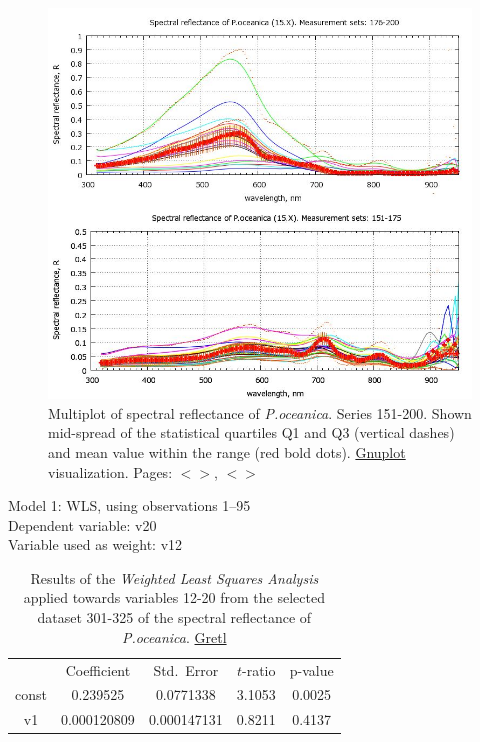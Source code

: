 \documentclass[11pt]{article}
\begin{document}
\begin{appendices}
\begin{figure}[H]
	\begin{center}
		\includegraphics[scale=0.38]{GNU-15.jpg}
		\caption{Multiplot of spectral reflectance of \textit{P.oceanica}. Series 151-200. Shown mid-spread of the statistical quartiles Q1 and Q3 (vertical dashes) and mean value within the range (red bold dots). \href{http://www.gnuplot.info/}{Gnuplot} visualization­. Pages: $<$\pageref{page-28}$>$, $<$\pageref{page-39}$>$}
		\label{fig:A.28}
	\end{center}
\end{figure}
\pagebreak

\begin{table}[H]
	\begin{center}
	\caption{Results of the \textit{Weighted Least Squares Analysis} applied towards variables 12-20 from the selected dataset 301-325 of the spectral reflectance of \textit{P.oceanica}. \href{http://gretl.sourceforge.net/}{Gretl}}
		Model 1: WLS, using observations 1--95\\
		Dependent variable: v20\\
		Variable used as weight: v12

	\vspace{1em}
	\begin{tabular}{|c|c|c|c|c|}
		  & {Coefficient} & {Std.\ Error} & {$t$-ratio} & {p-value} \\[1ex]
		const &   0.239525 &     0.0771338 & 3.1053 &         0.0025 \\
		v1 &   0.000120809 &     0.000147131 &       0.8211 &         0.4137 \\
	\end{tabular}


\end{center}
\end{table}
\end{appendices}
\end{document}
